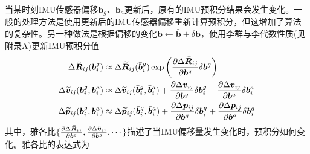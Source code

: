 当某时刻IMU传感器偏移$\boldsymbol{b}_g$、$\boldsymbol{b}_a$更新后，原有的IMU预积分结果会发生变化。一般的处理方法是使用更新后的IMU传感器偏移重新计算预积分，但这增加了算法的复杂性。另一种做法是根据偏移的变化$\boldsymbol{b} \leftarrow \bar{\boldsymbol{b}}+\delta \boldsymbol{b}$，使用李群与李代数性质(见附录A)更新IMU预积分值
\begin{equation}
\label{equ5.25}
\begin{aligned}
\Delta \widetilde{\boldsymbol{R}}_{ij}(\boldsymbol{b}_i^g) &\approx  \Delta \widetilde{\boldsymbol{R}}_{ij}(\bar{\boldsymbol{b}}_i^g) \exp \left( { \partial \Delta \bar{\boldsymbol{R}}_{ij} \over \partial \boldsymbol{b}^g } \delta \boldsymbol{b}^g \right) 
\\
\Delta \widetilde{\boldsymbol{v}}_{ij}(\boldsymbol{b}_i^g,\boldsymbol{b}_i^a) &\approx \Delta \widetilde{\boldsymbol{v}}_{ij}(\bar{\boldsymbol{b}}_i^g,\bar{\boldsymbol{b}}_i^a) + { \partial \Delta \bar{\boldsymbol{v}}_{ij} \over \partial \boldsymbol{b}^g } \delta \boldsymbol{b}_i^g + { \partial \Delta \bar{\boldsymbol{v}}_{ij} \over \partial \boldsymbol{b}^a } \delta \boldsymbol{b}_i^a 				
\\
\Delta \widetilde{\boldsymbol{p}}_{ij}(\boldsymbol{b}_i^g,\boldsymbol{b}_i^a) &\approx \Delta \widetilde{\boldsymbol{p}}_{ij}(\bar{\boldsymbol{b}}_i^g,\bar{\boldsymbol{b}}_i^a) + { \partial \Delta \bar{\boldsymbol{p}}_{ij} \over \partial \boldsymbol{b}^g } \delta \boldsymbol{b}_i^g + { \partial \Delta \bar{\boldsymbol{p}}_{ij} \over \partial \boldsymbol{b}^a } \delta \boldsymbol{b}_i^a 	
\end{aligned}
\end{equation}
其中，雅各比$\{ { \partial \Delta \bar{\boldsymbol{R}}_{ij} \over \partial \boldsymbol{b}^g },{ \partial \Delta \bar{\boldsymbol{v}}_{ij} \over \partial \boldsymbol{b}^g }, \cdots \} $描述了当IMU偏移量发生变化时，预积分如何变化。雅各比的表达式为
